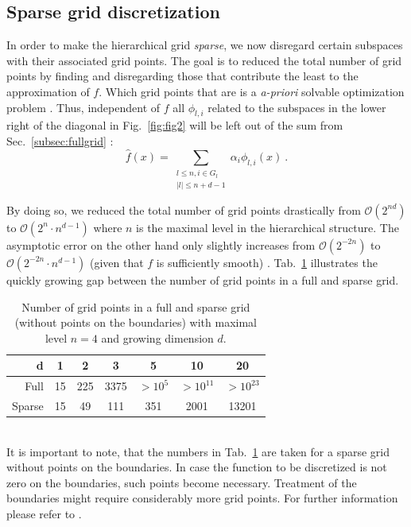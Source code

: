 \subsection{Sparse grid discretization}
In order to make the hierarchical grid \emph{sparse}, we now disregard certain
subspaces with their associated  grid points. The goal is to reduced the total
number of grid points by finding and disregarding those that contribute the
least to the approximation of $f$.
Which grid points that are is a \emph{a-priori}
solvable optimization problem \cite{disspfl}.
Thus, independent of $f$ all $\phi_{l,i}$
related to the subspaces in the
lower right of the diagonal in Fig.~\ref{fig:fig2} will be left out of the sum
from Sec.~\ref{subsec:fullgrid} \cite{disspfl, artbunshort}:
$$\hat{f}(x) =  \sum_{\substack{l \leq n, i \in G_l\\
    |l| \leq n + d - 1}}{\alpha_i\phi_{l,i}(x)} \ .$$
\par
By doing so, we reduced the total number of grid points drastically
from $\mathcal{O}(2^{nd})$ to $\mathcal{O}(2^{n} \cdot n^{d-1})$ where $n$ is
the maximal level in the hierarchical structure. The asymptotic error on the
other hand only slightly increases from $\mathcal{O}(2^{-2n})$ to
\mbox{$\mathcal{O}(2^{-2n} \cdot n^{d-1})$} (given that $f$ is sufficiently smooth)
\cite{disspfl}. Tab.~\ref{tab:tab1}
illustrates the quickly
growing gap between the number of grid points in a full and sparse grid.
\begin{table}[h]
  \centering
  \begin{tabular}{r | c | c | c | c | c | c}
    d & 1 & 2 & 3 & 5 & 10 & 20 \\
    \hline\hline
    Full & 15 &  225 & 3375 & $>10^5$ & $> 10^{11}$ & $> 10^{23}$ \\
    \hline
    Sparse & 15 & 49 & 111 & 351 & 2001 & 13201 \\
  \end{tabular}
  \captionsetup{width=0.44\textwidth}
  \caption{Number of grid points in a full and sparse grid
    (without points on the boundaries)
    with maximal level $n = 4$ and growing dimension $d$.\label{tab:tab1}}
\end{table}\\
It is important to note, that the numbers in Tab.~\ref{tab:tab1} are taken
for a sparse grid without points on the boundaries. In case the function
to be discretized is not zero on the boundaries, such points become necessary.
Treatment of the boundaries might require considerably
more grid points. For further information please refer to
\cite{disspfl, disspeh}.

